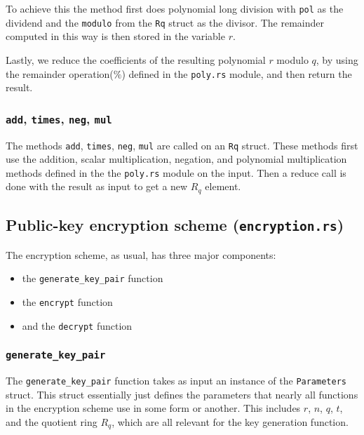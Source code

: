 \documentclass[../main.tex]{subfiles}
\begin{document}
To achieve this the method first does polynomial long division with \lstinline{pol} as the dividend and the \lstinline{modulo} from the \lstinline{Rq} struct as the divisor. The remainder computed in this way is then stored in the variable $r$.

Lastly, we reduce the coefficients of the resulting polynomial $r$ modulo $q$, by using the remainder operation($\%$) defined in the \lstinline{poly.rs} module, and then return the result.

\subsubsection{\lstinline{add}, \lstinline{times}, \lstinline{neg}, \lstinline{mul}}
The methods \lstinline{add}, \lstinline{times}, \lstinline{neg}, \lstinline{mul} are called on an \lstinline{Rq} struct. These methods first use the addition, scalar multiplication, negation, and polynomial multiplication methods defined in the the \lstinline{poly.rs} module on the input. Then a reduce call is done with the result as input to get a new $R_q$ element.

\subsection{Public-key encryption scheme (\lstinline{encryption.rs})}

The encryption scheme, as usual, has three major components:

\begin{itemize}
  \item the \lstinline{generate_key_pair} function
  \item the \lstinline{encrypt} function
  \item and the \lstinline{decrypt} function
\end{itemize}

\subsubsection{\lstinline{generate_key_pair}}

The \lstinline{generate_key_pair} function takes as input an instance of the \lstinline{Parameters} struct.
This struct essentially just defines the parameters that nearly all functions in the encryption scheme use in some form or another.
This includes $r$, $n$, $q$, $t$, and the quotient ring $R_q$, which are all relevant for the key generation function.
\end{document}
